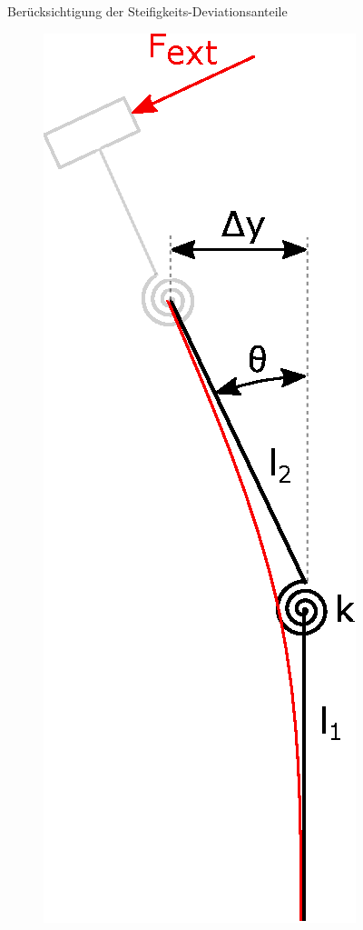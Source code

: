 \documentclass[10pt,xcolor=dvipsnames]{beamer}
\begin{document}
\begin{frame}{\small Berücksichtigung der Steifigkeits-Deviationsanteile}
\begin{minipage}{0.3\textwidth}
\begin{figure}
				\includegraphics[width=0.7\linewidth]{./pics/rotBody_idea.eps}
			\end{figure}
		\end{minipage}
		
	\end{frame}
\end{document}
